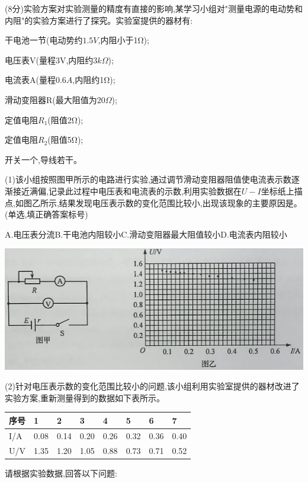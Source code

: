 \question[6] (8分)实验方案对实验测量的精度有直接的影响,某学习小组对"测量电源的电动势和内阻"的实验方案进行了探究。实验室提供的器材有:

干电池一节(电动势约$1.5V$,内阻小于1Ω);

电压表V(量程3V,内阻约$3kΩ$);

电流表A(量程$0.6A$,内阻约1Ω);

滑动变阻器R(最大阻值为$20Ω$);

定值电阻$R_1$(阻值2Ω);

定值电阻$R_2$(阻值5Ω);

开关一个,导线若干。

(1)该小组按照图甲所示的电路进行实验,通过调节滑动变阻器阻值使电流表示数逐渐接近满偏,记录此过程中电压表和电流表的示数,利用实验数据在$U-I$坐标纸上描点,如图乙所示,结果发现电压表示数的变化范围比较小,出现该现象的主要原因是。(单选,填正确答案标号)

A.电压表分流B.干电池内阻较小C.滑动变阻器最大阻值较小D.电流表内阻较小\begin{center}\includegraphics[]{img/image12.png}\end{center}

(2)针对电压表示数的变化范围比较小的问题,该小组利用实验室提供的器材改进了实验方案,重新测量得到的数据如下表所示。

\begin{table}[h]
    \begin{center}
        \begin{tabular}{|l|l|l|l|l|l|l|l|}
            \hline
            序号  & 1    & 2    & 3    & 4    & 5    & 6    & 7    \\ \hline
            I/A & 0.08 & 0.14 & 0.20 & 0.26 & 0.32 & 0.36 & 0.40 \\ \hline
            U/V & 1.35 & 1.20 & 1.05 & 0.88 & 0.73 & 0.71 & 0.52 \\ \hline
            \end{tabular}
    \end{center}
\end{table}
请根据实验数据,回答以下问题:

